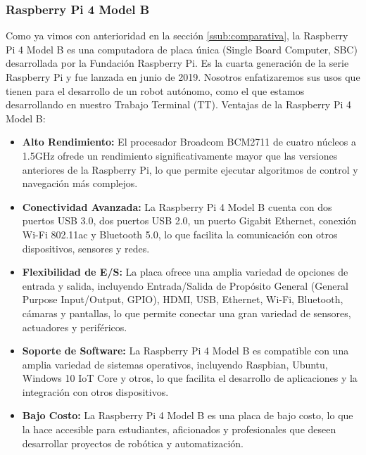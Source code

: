 \subsubsection{Raspberry Pi 4 Model B} %
\label{subsubsection:rasp4}
    Como ya vimos con anterioridad en la secci\'on \ref{ssub:comparativa}, la Raspberry Pi 4 Model B es una computadora de placa \'unica 
    (Single Board Computer, SBC) desarrollada por la Fundaci\'on Raspberry Pi. Es la cuarta generaci\'on de la serie Raspberry Pi y fue lanzada en 
        junio de 2019. Nosotros enfatizaremos sus usos que tienen para el desarrollo de un robot aut\'onomo, como el que estamos
        desarrollando en nuestro Trabajo Terminal (TT).
    \vskip 0.5cm
    Ventajas de la Raspberry Pi 4 Model B:
    \begin{itemize}
        \item \textbf{Alto Rendimiento:} El procesador Broadcom BCM2711 de cuatro n\'ucleos a 1.5GHz ofrede un rendimiento 
            significativamente mayor que las versiones anteriores de la Raspberry Pi, lo que permite ejecutar algoritmos 
            de control y navegaci\'on m\'as complejos.
        \item \textbf{Conectividad Avanzada:} La Raspberry Pi 4 Model B cuenta con dos puertos USB 3.0, dos puertos USB 2.0, 
            un puerto Gigabit Ethernet, conexi\'on Wi-Fi 802.11ac y Bluetooth 5.0, lo que facilita la comunicaci\'on con otros
            dispositivos, sensores y redes.
        \item \textbf{Flexibilidad de E/S:} La placa ofrece una amplia variedad de opciones de entrada y salida, incluyendo
            Entrada/Salida de Prop\'osito General (General Purpose Input/Output, GPIO), HDMI, USB, Ethernet, Wi-Fi, Bluetooth, c\'amaras y pantallas, lo que permite conectar una gran variedad de
            sensores, actuadores y perif\'ericos.
        \item \textbf{Soporte de Software:} La Raspberry Pi 4 Model B es compatible con una amplia variedad de sistemas
            operativos, incluyendo Raspbian, Ubuntu, Windows 10 IoT Core y otros, lo que facilita el desarrollo de aplicaciones
            y la integraci\'on con otros dispositivos.
        \item \textbf{Bajo Costo:} La Raspberry Pi 4 Model B es una placa de bajo costo, lo que la hace accesible para
            estudiantes, aficionados y profesionales que deseen desarrollar proyectos de rob\'otica y automatizaci\'on.
    \end{itemize}
